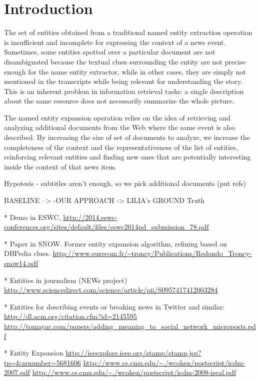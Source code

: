 \documentclass{llncs}
\begin{document}
\section{Introduction}
\label{sec:introduction}
The set of entities obtained from a traditional named entity extraction operation is insufficient and incomplete for expressing the context of a news event. Sometimes, some entities spotted over a particular document are not disambiguated because the textual clues surrounding the entity are not precise enough for the name entity extractor, while in other cases, they are simply not mentioned in the transcripts while being relevant for understanding the story. This is an inherent problem in information retrieval tasks: a single description about the same resource does not necessarily summarize the whole picture.

The named entity expansion operation relies on the idea of retrieving and analyzing additional documents from the Web where the same event is also described. By increasing the size of set of documents to analyze, we increase the completeness of the context and the representativeness of the list of entities, reinforcing relevant entities and finding new ones that are potentially interesting inside the context of that news item.

Hypotesis
- subtitles aren't enough, so we pick additional documents (put refs)
		
BASELINE --> -OUR APPROACH -> LILIA's GROUND Truth

* Demo in ESWC,
\url{http://2014.eswc-conferences.org/sites/default/files/eswc2014pd_submission_78.pdf}

* Paper in SNOW. Former entity expansion algorithm, refining based on DBPedia clues.
\url{http://www.eurecom.fr/~troncy/Publications/Redondo_Troncy-snow14.pdf}

* Entities in journalism (NEWs project)
\url{http://www.sciencedirect.com/science/article/pii/S0957417412003284}

* Entities for describing events or breaking news in Twitter and similar:
\url{http://dl.acm.org/citation.cfm?id=2145595}
\url{http://tomayac.com/papers/adding_meaning_to_social_network_microposts.pdf}

* Entity Expansion
\url{http://ieeexplore.ieee.org/stamp/stamp.jsp?tp=&arnumber=5681606}
\url{http://www.cs.cmu.edu/~./wcohen/postscript/icdm-2007.pdf}
\url{http://www.cs.cmu.edu/~./wcohen/postscript/icdm-2008-iseal.pdf}
\end{document}

